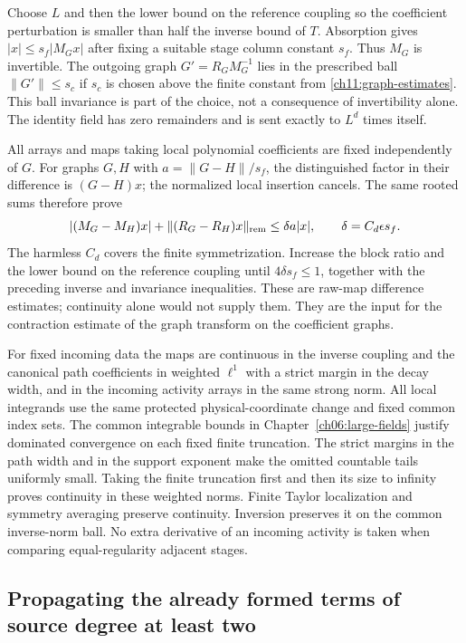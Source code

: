 Choose $L$ and then the lower bound on the reference coupling so the coefficient
perturbation is smaller than half the inverse bound of $T$.
Absorption gives $|x|\le s_f|M_Gx|$ after fixing a suitable stage
column constant $s_f$. Thus $M_G$ is invertible.
The outgoing graph $G'=R_GM_G^{-1}$ lies in the prescribed ball
$\|G'\|\le s_c$ if $s_c$ is chosen above the finite constant from
\eqref{ch11:graph-estimates}. This ball invariance is part of the
choice, not a consequence of invertibility alone.
The identity field has zero remainders and is sent exactly to $L^d$ times itself.

All arrays and maps taking local polynomial coefficients are fixed independently of $G$.
For graphs $G,H$ with $a=\|G-H\|/s_f$, the distinguished factor in
their difference is $(G-H)x$; the normalized local insertion cancels.
The same rooted sums therefore prove
\begin{equation}
 |(M_G-M_H)x|+\|(R_G-R_H)x\|_{\rm rem}
                         \le\delta a|x|,
 \qquad \delta=C_d\epsilon s_f .
 \label{ch11:graph-difference}
\end{equation}
The harmless $C_d$ covers the finite symmetrization.
Increase the block ratio and the lower bound on the reference coupling until $4\delta s_f\le1$,
together with the preceding inverse and invariance inequalities.
These are raw-map difference estimates; continuity alone
would not supply them. They are the input for the contraction estimate
of the graph transform on the coefficient graphs.

For fixed incoming data the maps are continuous in the inverse coupling
and the canonical path coefficients in weighted $\ell^1$ with a strict margin in the decay width, and in the incoming activity arrays in the same strong norm. All local integrands use the same
protected physical-coordinate change and fixed common index sets.
The common integrable bounds in Chapter~\ref{ch06:large-fields}
justify dominated convergence on each fixed finite truncation. The strict margins in the path width and in the support exponent make the omitted countable tails uniformly small. Taking the finite truncation first and then its size to infinity proves continuity in these weighted norms. Finite Taylor localization and symmetry
averaging preserve continuity. Inversion preserves it on the common
inverse-norm ball. No extra derivative of an incoming activity is
taken when comparing equal-regularity adjacent stages.

\subsection{Propagating the already formed terms of source degree at least two}
\label{ch11:higher-modes}

